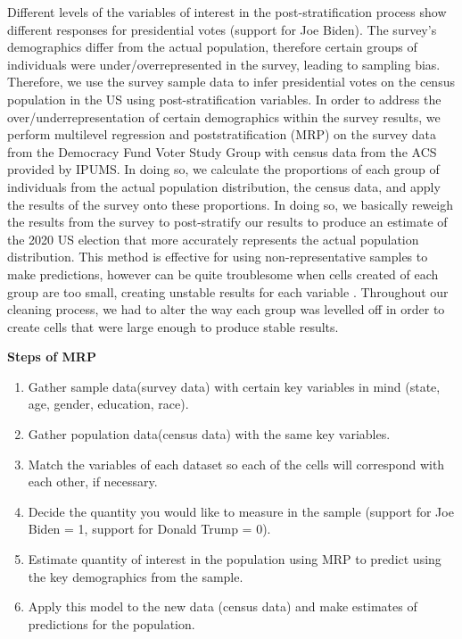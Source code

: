 \documentclass[
]{article}
\providecommand{\tightlist}{%
  \setlength{\itemsep}{0pt}\setlength{\parskip}{0pt}}
\begin{document}
Different levels of the variables of interest in the post-stratification process show different responses for presidential votes (support for Joe Biden). The survey's demographics differ from the actual population, therefore certain groups of individuals were under/overrepresented in the survey, leading to sampling bias. Therefore, we use the survey sample data to infer presidential votes on the census population in the US using post-stratification variables.
In order to address the over/underrepresentation of certain demographics within the survey results, we perform multilevel regression and poststratification (MRP) on the survey data from the Democracy Fund Voter Study Group with census data from the ACS provided by IPUMS. In doing so, we calculate the proportions of each group of individuals from the actual population distribution, the census data, and apply the results of the survey onto these proportions. In doing so, we basically reweigh the results from the survey to post-stratify our results to produce an estimate of the 2020 US election that more accurately represents the actual population distribution. This method is effective for using non-representative samples to make predictions, however can be quite troublesome when cells created of each group are too small, creating unstable results for each variable \citep{citeMJAlexander}. Throughout our cleaning process, we had to alter the way each group was levelled off in order to create cells that were large enough to produce stable results.

\textbf{Steps of MRP}

\begin{enumerate}
\def\labelenumi{\arabic{enumi}.}
\tightlist
\item
  Gather sample data(survey data) with certain key variables in mind (state, age, gender, education, race).
\item
  Gather population data(census data) with the same key variables.
\item
  Match the variables of each dataset so each of the cells will correspond with each other, if necessary.
\item
  Decide the quantity you would like to measure in the sample (support for Joe Biden = 1, support for Donald Trump = 0).
\item
  Estimate quantity of interest in the population using MRP to predict using the key demographics from the sample.
\item
  Apply this model to the new data (census data) and make estimates of predictions for the population.
\end{enumerate}
\end{document}
